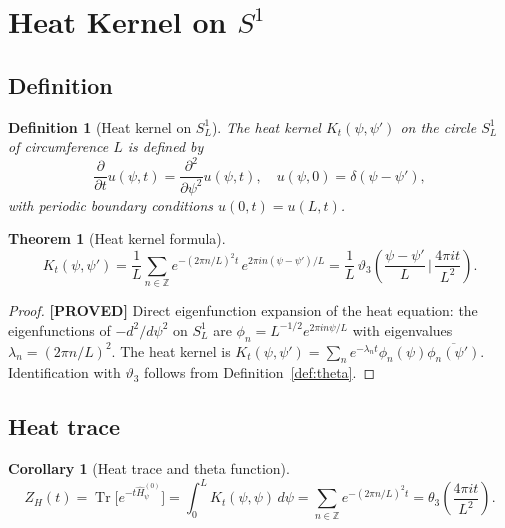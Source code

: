 \documentclass[11pt,a4paper]{article}
\newtheorem{theorem}{Theorem}
\newtheorem{corollary}{Corollary}
\newtheorem{definition}{Definition}
\newcommand{\proved}[1]{\textbf{[PROVED]} #1}
\begin{document}
\section{Heat Kernel on \texorpdfstring{$S^1$}{S1}}

\subsection{Definition}

\begin{definition}[Heat kernel on $S^1_{L}$]
  The heat kernel $K_t(\psi, \psi')$ on the circle $S^1_L$ of circumference $L$
  is defined by
  \[
    \frac{\partial}{\partial t} u(\psi, t) = \frac{\partial^2}{\partial\psi^2} u(\psi,t),
    \quad u(\psi, 0) = \delta(\psi - \psi'),
  \]
  with periodic boundary conditions $u(0,t) = u(L,t)$.
\end{definition}

\begin{theorem}[Heat kernel formula]
  \label{thm:heatkernel}
  \[
    K_t(\psi,\psi') = \frac{1}{L}\sum_{n\in\mathbb{Z}} e^{-(2\pi n/L)^2 t}\,
    e^{2\pi i n(\psi-\psi')/L}
    = \frac{1}{L}\,\vartheta_3\!\left(\frac{\psi-\psi'}{L}\,\bigg|\,
    \frac{4\pi i t}{L^2}\right).
  \]
\end{theorem}

\begin{proof}
  \proved{} Direct eigenfunction expansion of the heat equation:
  the eigenfunctions of $-d^2/d\psi^2$ on $S^1_L$ are $\phi_n = L^{-1/2}e^{2\pi in\psi/L}$
  with eigenvalues $\lambda_n = (2\pi n/L)^2$.  The heat kernel is
  $K_t(\psi,\psi') = \sum_n e^{-\lambda_n t}\phi_n(\psi)\overline{\phi_n(\psi')}$.
  Identification with $\vartheta_3$ follows from Definition~\ref{def:theta}.
\end{proof}

\subsection{Heat trace}

\begin{corollary}[Heat trace and theta function]
  \label{cor:trace}
  \[
    Z_H(t) = \operatorname{Tr}\bigl[e^{-t\hat{H}_\psi^{(0)}}\bigr]
    = \int_0^L K_t(\psi,\psi)\, d\psi
    = \sum_{n\in\mathbb{Z}} e^{-(2\pi n/L)^2 t}
    = \theta_3\!\left(\frac{4\pi i t}{L^2}\right).
  \]
\end{corollary}
\end{document}

